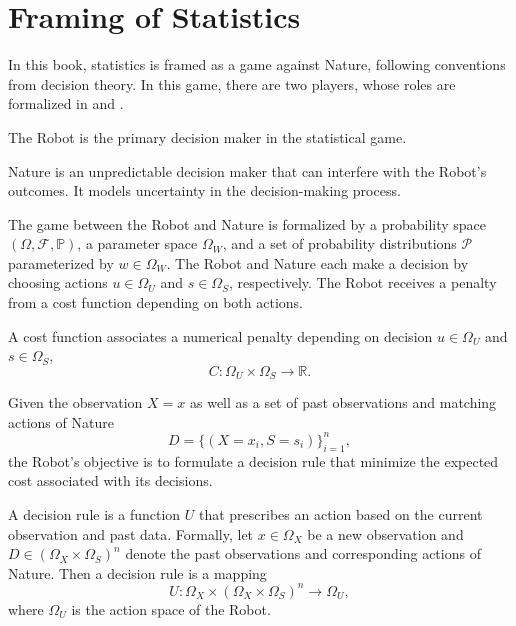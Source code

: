 \section{Framing of Statistics}
\label{sec:framing_statistics}
In this book, statistics is framed as a game against Nature, following conventions from decision theory\cite{lavalle2006planning}. In this game, there are two players, whose roles are formalized in  and .

\begin{definition}[Robot]
	\label{def:robot}
	The Robot is the primary decision maker in the statistical game.
\end{definition}

\begin{definition}[Nature]
	\label{def:nature}	
	Nature is an unpredictable decision maker that can interfere with the Robot's outcomes. It models uncertainty in the decision-making process.
\end{definition}

\begin{remark}
	The game between the Robot and Nature is formalized by a probability space $(\Omega, \mathcal{F}, \mathbb{P})$, a parameter space $\Omega_W$, and a set of probability distributions $\mathcal{P}$ parameterized by $w\in \Omega_W$. The Robot and Nature each make a decision by choosing actions $u \in \Omega_U$ and $s \in \Omega_S$, respectively. The Robot receives a penalty from a cost function depending on both actions.
\end{remark}

\begin{definition}
	\label{def:cost_function}
	A cost function associates a numerical penalty depending on decision $u \in \Omega_U$ and $s \in \Omega_S$,
	\begin{equation}
		C: \Omega_U \times \Omega_S \to \mathbb{R}.
	\end{equation}
\end{definition}
Given the observation $X=x$ as well as a set of past observations and matching actions of Nature
\begin{equation}
	D=\{(X = x_i,S= s_i)\}_{i=1}^n,
\end{equation}
the Robot's objective is to formulate a decision rule that minimize the expected cost associated with its decisions\cite{murphy2023probabilistic}.
\begin{definition}
	\label{def:decision_rule}
	A decision rule is a function $U$ that prescribes an action based on the current observation and past data. Formally, let $x \in \Omega_X$ be a new observation and $D \in (\Omega_X \times \Omega_S)^n$ denote the past observations and corresponding actions of Nature. Then a decision rule is a mapping
	\begin{equation}
		U: \Omega_X \times (\Omega_X \times \Omega_S)^n \to \Omega_U,
	\end{equation}
	where $\Omega_U$ is the action space of the Robot.
\end{definition}

